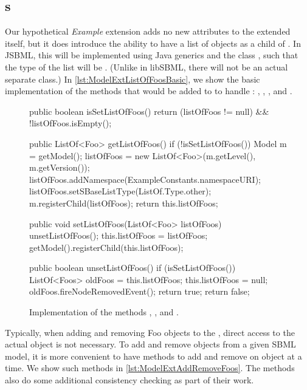 \subsection{s}
\label{sec:listofs}

Our hypothetical \emph{Example} extension adds no new attributes to the
extended \Model itself, but it does introduce the ability to have a list of
 objects as a child of \Model.  In JSBML, this will be
implemented using Java generics and the class , such that the
type of the list will be .  (Unlike in libSBML, there
will not be an actual separate  class.)  In
\vref{lst:ModelExtListOfFoosBasic}, we show the basic implementation
of the methods that would be added to \Model to handle
: , ,
, and .

\begin{figure}[b]
  \begin{example}[numbers=left]
public boolean isSetListOfFoos() {
  return (listOfFoos != null) && !listOfFoos.isEmpty();
}

public ListOf<Foo> getListOfFoos() {
  if (!isSetListOfFoos()) {
    Model m = getModel();
    listOfFoos = new ListOf<Foo>(m.getLevel(), m.getVersion());
    listOfFoos.addNamespace(ExampleConstants.namespaceURI);
    listOfFoos.setSBaseListType(ListOf.Type.other);
    m.registerChild(listOfFoos);
  }
  return this.listOfFoos;
}

public void setListOfFoos(ListOf<Foo> listOfFoos) {
  unsetListOfFoos();
  this.listOfFoos = listOfFoos;
  getModel().registerChild(this.listOfFoos);
}

public boolean unsetListOfFoos() {
  if (isSetListOfFoos()) {
    ListOf<Foos> oldFoos = this.listOfFoos;
    this.listOfFoos = null;
    oldFoos.fireNodeRemovedEvent();
    return true;
  }
  return false;
}\end{example}
  \caption{Implementation of the methods ,
    , and .}
  \label{lst:ModelExtListOfFoosBasic}
\end{figure}

Typically, when adding and removing Foo objects to the \Model, direct
access to the actual  object is not necessary.  To add and
remove  objects from a given SBML model, it is more convenient to
have methods to add and remove on  object at a time.  We show
such methods in \vref{lst:ModelExtAddRemoveFoos}.  The methods also
do some additional consistency checking as part of their work.

